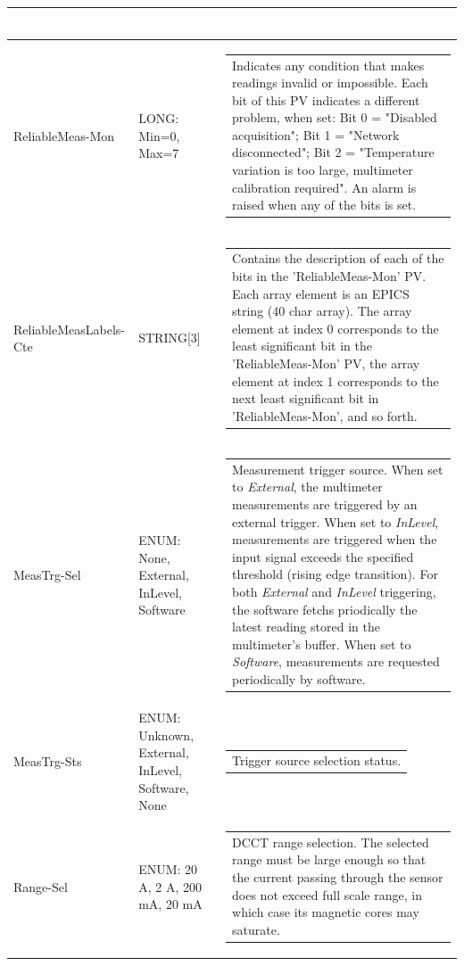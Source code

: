 \documentclass[openany]{article}
\begin{document}
\begin{longtable}{| m{3.0cm} m{4.5cm} m{7.0cm} |}
\begin{tabular}{@{}m{6cm}@{}}
						\end{tabular} \\ \hline
		ReliableMeas-Mon & LONG: Min=0, Max=7 & \begin{tabular}{@{}m{6cm}@{}}
	    					Indicates any condition that makes readings invalid or impossible. Each bit of this PV indicates a different problem, when set: Bit 0 = "Disabled acquisition"; Bit 1 = "Network disconnected"; Bit 2 = "Temperature variation is too large, multimeter calibration required". An alarm is raised when any of the bits is set.
						\end{tabular} \\ \hline
		ReliableMeasLabels-Cte & STRING[3] & \begin{tabular}{@{}m{6cm}@{}}
	    					Contains the description of each of the bits in the 'ReliableMeas-Mon' PV. Each array element is an EPICS string (40 char array). The array element at index 0 corresponds to the least significant bit in the 'ReliableMeas-Mon' PV, the array element at index 1 corresponds to the next least significant bit in 'ReliableMeas-Mon', and so forth.
						\end{tabular} \\ \hline
		MeasTrg-Sel & ENUM: None, External, InLevel, Software & \begin{tabular}{@{}m{6cm}@{}}
				      	  Measurement trigger source. When set to \emph{External}, the multimeter measurements are triggered by an external trigger. When set to \emph{InLevel}, measurements are triggered when the input signal exceeds the specified threshold (rising edge transition). For both \emph{External} and \emph{InLevel} triggering, the software fetchs priodically the latest reading stored in the multimeter's buffer. When set to \emph{Software}, measurements are requested periodically by software.
					  \end{tabular} \\ \hline
		MeasTrg-Sts & ENUM: Unknown, External, InLevel, Software, None & \begin{tabular}{@{}m{6cm}@{}}
	    					Trigger source selection status.
						\end{tabular} \\ \hline
		Range-Sel & ENUM: 20 A, 2 A, 200 mA, 20 mA & \begin{tabular}{@{}m{6cm}@{}}
	    					DCCT range selection. The selected range must be large enough so that the current passing through the sensor does not exceed full scale range, in which case its magnetic cores may saturate.

\end{tabular}
\end{longtable}
\end{document}
